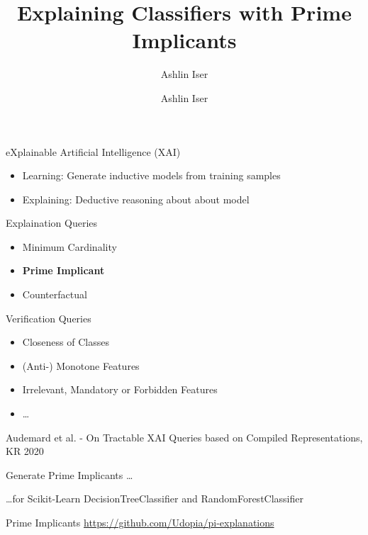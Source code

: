\documentclass[t]{beamer}
\title{Explaining Classifiers with Prime Implicants}
\subtitle{Ashlin Iser}
\author{Ashlin Iser}
\institute{KIT-Institute of Theoretical Informatics -- Algorithm Engineering}
\begin{document}
\begin{frame}
\maketitle
\end{frame}


\begin{frame}{eXplainable Artificial Intelligence (XAI)}
\begin{itemize}
\item Learning: Generate inductive models from training samples\\
\item Explaining: Deductive reasoning about about model
\end{itemize}
\begin{block}{Explaination Queries}
\begin{itemize}
\item Minimum Cardinality
\item \textbf{Prime Implicant}
\item Counterfactual
\end{itemize}
\end{block}
\begin{block}{Verification Queries}
\begin{itemize}
\item Closeness of Classes
\item (Anti-) Monotone Features
\item Irrelevant, Mandatory or Forbidden Features
\item \dots
\end{itemize}
\end{block}
\footnotesize{Audemard et al. - On Tractable XAI Queries based on Compiled Representations, KR 2020}
\end{frame}


\begin{frame}{Generate Prime Implicants \dots }

\dots for Scikit-Learn \textsf{DecisionTreeClassifier} and \textsf{RandomForestClassifier}

\begin{block}{Prime Implicants}
\url{https://github.com/Udopia/pi-explanations}
\end{block}
\end{frame}
\end{document}
